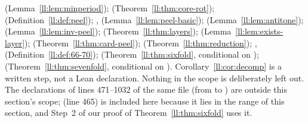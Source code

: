  (Lemma~\ref{ll:lem:minperiod});
 (Theorem~\ref{ll:thm:core-rot});
 (Definition~\ref{ll:def:peel}); ,  (Lemma~\ref{ll:lem:peel-basic});
 (Lemma~\ref{ll:lem:antitone});
 (Lemma~\ref{ll:lem:inv-peel});
 (Theorem~\ref{ll:thm:layers});
 (Lemma~\ref{ll:lem:exists-layer});
 (Theorem~\ref{ll:thm:card-peel});
 (Theorem~\ref{ll:thm:reduction});
,  (Definition~\ref{ll:def:66-70});
 (Theorem~\ref{ll:thm:sixfold}, conditional on );
 (Theorem~\ref{ll:thm:sevenfold}, conditional on ).
Corollary~\ref{ll:cor:decomp} is a written step, not a Lean declaration. Nothing in the scope is deliberately left out.
The declarations of lines 471--1032 of the same file (from  to ) are
outside this section's scope;  (line 465) is included here because it lies in the range of this
section, and Step~2 of our proof of Theorem~\ref{ll:thm:sixfold} uses it.
